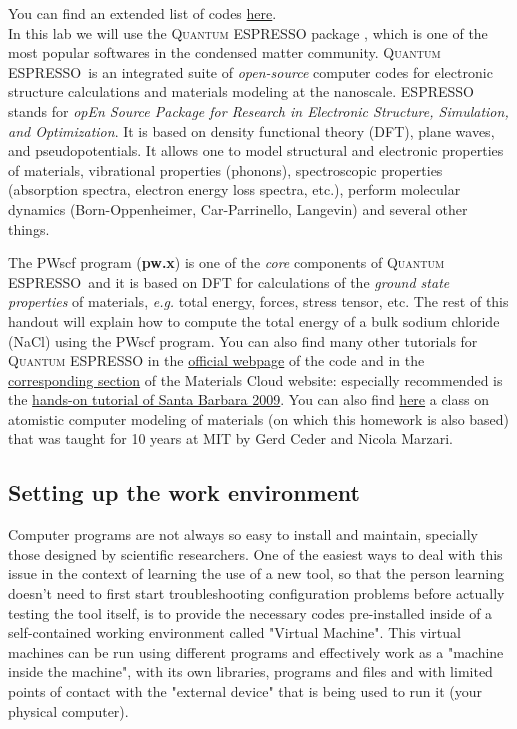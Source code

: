 \documentclass[12pt]{article}
\def\QE{\textsc{Quantum ESPRESSO}\xspace}
\begin{document}
    You can find an extended list of codes
    \href{http://nomad-coe.eu/index.php?page=codes}{here}.\\

    In this lab we will use the \QE package \cite{Giannozzi2009quantum}, which is one of the most popular softwares in the condensed matter community. \QE\, is an integrated suite of {\it open-source} computer codes for electronic structure calculations and materials modeling at the nanoscale. \textsc{ESPRESSO} stands for {\it opEn Source Package for Research in Electronic Structure, Simulation, and Optimization}. It is based on density functional theory (DFT), plane waves, and pseudopotentials. It allows one to model structural and electronic properties of materials, vibrational properties (phonons), spectroscopic properties (absorption spectra, electron energy loss spectra, etc.), perform molecular dynamics (Born-Oppenheimer, Car-Parrinello, Langevin) and several other things.

    The PWscf program ({\bf pw.x}) is one of the {\it core} components of \QE\, and it is based on DFT for calculations of the {\it ground state properties} of materials, {\it e.g.} total energy, forces, stress tensor, etc. The rest of this handout will explain how to compute the total energy of a bulk sodium chloride (NaCl) using the PWscf program.
    You can also find many other tutorials for \QE in the
    \href{https://www.quantum-espresso.org/resources/tutorials}{official webpage} of the code and in the
    \href{https://www.materialscloud.org/learn/sections/VLoB41/quantum-espresso-schools}
    {corresponding section} of the Materials Cloud website: especially recommended is the \href{https://www.materialscloud.org/learn/sections/Kr5WSY/summer-school-quantum-espresso-santa-barbara-2009}{hands-on tutorial of Santa Barbara 2009}.
    You can also find \href{https://www.quantum-espresso.org/resources/tutorials}{here}
    a class on atomistic computer modeling of materials (on which this homework is also based) that was taught for 10 years at MIT by Gerd Ceder and Nicola Marzari. 


\vspace{6mm}
\subsection{Setting up the work environment}

Computer programs are not always so easy to install and maintain, specially those
designed by scientific researchers.
One of the easiest ways to deal with this issue in the context of learning the use
of a new tool, so that the person learning doesn't need to first start troubleshooting
configuration problems before actually testing the tool itself, is to provide
the necessary codes pre-installed inside of a self-contained working environment
called "Virtual Machine".
This virtual machines can be run using different programs and effectively work
as a "machine inside the machine", with its own libraries, programs and files
and with limited points of contact with the "external device" that is being used
to run it (your physical computer).
\end{document}
